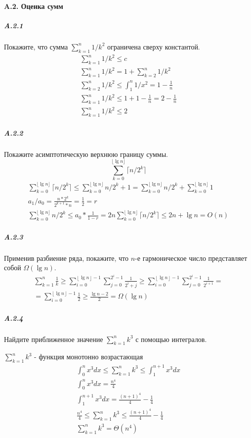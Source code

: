 \paragraph{A.2. Оценка сумм}
\subparagraph{A.2.1}
Покажите, что сумма $\sum_{k=1}^{n} {1/k^2}$ ограничена сверху константой.
\begin{gather*}
\sum_{k=1}^{n} {1/k^2} \leq c \\
\sum_{k=1}^{n} {1/k^2} = 1 + \sum_{k=2}^{n} {1/k^2} \\
\sum_{k=2}^{n} {1/k^2} \leq \int_{1}^{n} {1/x^2} = 1 - \frac{1}{n} \\
\sum_{k=1}^{n} {1/k^2} \leq 1 + 1 - \frac{1}{n} = 2 - \frac{1}{n} \\ 
\sum_{k=1}^{n} {1/k^2} \leq 2
\end{gather*}

\subparagraph{A.2.2}
Покажите асимптотическую верхнюю границу суммы.
$$ \sum_{k=0}^{\lfloor \lg{n} \rfloor } {\lceil n/2^k \rceil}$$
\begin{gather*}
\sum_{k=0}^{\lfloor \lg{n} \rfloor } {\lceil n/2^k \rceil} \leq \sum_{k=0}^{\lfloor \lg{n} \rfloor }{n/2^k + 1} = \sum_{k=0}^{\lfloor \lg{n} \rfloor }{n/2^k} + \sum_{k=0}^{\lfloor \lg{n} \rfloor }{1} \\
a_1/a_0 = \frac{n * 2^k}{2^{k+1} * n} = \frac{1}{2} = r \\
\sum_{k=0}^{\lfloor \lg{n} \rfloor }{n/2^k} \leq a_0 * \frac{1}{1-r} = 2n
\sum_{k=0}^{\lfloor \lg{n} \rfloor } {\lceil n/2^k \rceil} \leq 2n + \lg{n} = O(n)
\end{gather*}

\subparagraph{A.2.3}
Применив разбиение ряда, покажите, что $n$-е гармоническое число представляет собой $\Omega(\lg{n})$.
\begin{gather*}
\sum_{k = 1}^{n} {\frac{1}{k}} \geq \sum_{i = 0}^{\left\lfloor \lg{n} \right\rfloor - 1} {\sum_{j = 0}^{2^i - 1} {\frac{1}{2^i + j}}} \geq \sum_{i = 0}^{\left\lfloor \lg{n} \right\rfloor - 1} {\sum_{j = 0}^{2^i - 1} {\frac{1}{2^{i+1}}}} = \\
= \sum_{i = 0}^{\left\lfloor \lg{n} \right\rfloor - 1} {\frac{1}{2}} \geq \frac{\lg{n} - 2}{2}  = \Omega(\lg{n})
\end{gather*}

\subparagraph{A.2.4}
Найдите приближенное значение $\sum_{k=1}^{n}{k^3}$ с помощью интегралов.

$\sum_{k=1}^{n}{k^3}$ - функция монотонно возрастающая
\begin{gather*}
\int_{0}^{n} {x^3dx} \leq \sum_{k=1}^{n}{k^3} \leq \int_{1}^{n+1} {x^3dx} \\
\int_{0}^{n} {x^3dx} = \frac{n^4}{4} \\
\int_{1}^{n+1} {x^3dx} = \frac{(n+1)^4}{4} - \frac{1}{4} \\
\frac{n^4}{4} \leq \sum_{k=1}^{n}{k^3} \leq \frac{(n+1)^4}{4} - \frac{1}{4} \\
\sum_{k=1}^{n}{k^3} = \Theta(n^4)
\end{gather*}

